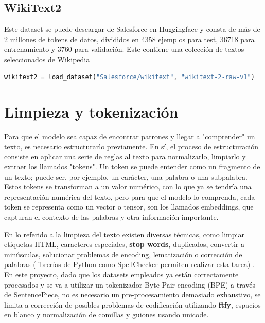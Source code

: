 \documentclass[11pt]{book}
\theoremstyle{plain}
\theoremstyle{definition}
\begin{document}
\subsection{WikiText2}
Este dataset se puede descargar de Salesforce en Huggingface y consta de más de 2 millones de tokens de datos, divididos en 4358 ejemplos para test, 36718 para entrenamiento y 3760 para validación. Este contiene una colección de textos seleccionados de Wikipedia \parencite{huggingface_wikitext} \parencite{autonlp2020linkedwikitext}

\begin{lstlisting}[language=Python]
wikitext2 = load_dataset("Salesforce/wikitext", "wikitext-2-raw-v1")
\end{lstlisting}

\section{Limpieza y tokenización}
Para que el modelo sea capaz de encontrar patrones y llegar a "comprender" un texto, es necesario estructurarlo previamente. En sí, el proceso de estructuración consiste en aplicar una serie de reglas al texto para normalizarlo, limpiarlo y extraer los llamados "tokens". Un token se puede entender como un fragmento de un texto; puede ser, por ejemplo, un carácter, una palabra o una subpalabra. Estos tokens se transforman a un valor numérico, con lo que ya se tendría una representación numérica del texto, pero para que el modelo lo comprenda, cada token se representa como un vector o tensor, son los llamados embeddings, que capturan el contexto de las palabras y otra información importante. \parencite{lmpo2020bpe}


En lo referido a la limpieza del texto existen diversas técnicas, como limpiar etiquetas HTML, caracteres especiales, \textbf{stop words}, duplicados, convertir a minúsculas, solucionar problemas de encoding, lematización o corrección de palabras (librerías de Python como SpellChecker permiten realizar esta tarea) \parencite{shabbir2021cleaning}. En este proyecto, dado que los datasets empleados ya están correctamente procesados y se va a utilizar un tokenizador Byte-Pair encoding (BPE) a través de SentencePiece, no es necesario un pre-procesamiento demasiado exhaustivo, se limita a corrección de posibles problemas de codificación utilizando \textbf{ftfy}, espacios en blanco y normalización de comillas y guiones usando unicode.
\end{document}
